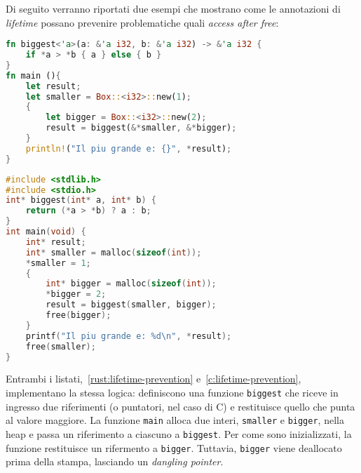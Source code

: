 Di seguito verranno riportati due esempi che mostrano come le annotazioni di \textit{lifetime} possano prevenire problematiche quali \textit{access after free}:
\begin{lstlisting}[language=Rust, caption={Prevenzione di \textit{access after free} tramite \textit{lifetime annotations}}, label={rust:lifetime-prevention}]
fn biggest<'a>(a: &'a i32, b: &'a i32) -> &'a i32 {
    if *a > *b { a } else { b }
}
fn main (){
    let result;
    let smaller = Box::<i32>::new(1);
    {
        let bigger = Box::<i32>::new(2);
        result = biggest(&*smaller, &*bigger);
    }
    println!("Il piu grande e: {}", *result);
}
\end{lstlisting}
\begin{lstlisting}[language=C, caption={\textit{Access after free} dovuta alla mancanza di \textit{lifetime} in C}, label={c:lifetime-prevention}]
#include <stdlib.h>
#include <stdio.h>
int* biggest(int* a, int* b) {
    return (*a > *b) ? a : b;
}
int main(void) {
    int* result;
    int* smaller = malloc(sizeof(int));
    *smaller = 1;
    {
        int* bigger = malloc(sizeof(int));
        *bigger = 2;
        result = biggest(smaller, bigger);
        free(bigger);
    }
    printf("Il piu grande e: %d\n", *result);
    free(smaller);
}
\end{lstlisting}
Entrambi i listati,~\ref{rust:lifetime-prevention} e~\ref{c:lifetime-prevention}, implementano la stessa logica: definiscono una funzione \texttt{biggest} che
riceve in ingresso due riferimenti (o puntatori, nel caso di C) e restituisce quello che punta al valore maggiore.
La funzione \texttt{main} alloca due interi, \texttt{smaller} e \texttt{bigger}, nella heap e passa un riferimento a ciascuno a 
\texttt{biggest}.
Per come sono inizializzati, la funzione restituisce un rifermento a \texttt{bigger}. Tuttavia, \texttt{bigger} viene deallocato prima della stampa, lasciando un \textit{dangling pointer}.

